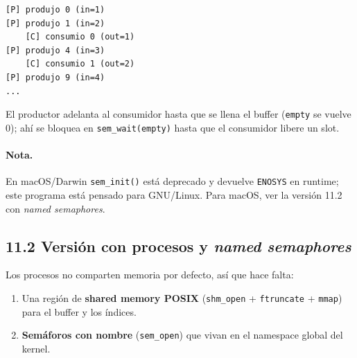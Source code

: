\documentclass[11pt,a4paper]{article}
\begin{document}
\begin{lstlisting}[style=textstyle]
[P] produjo 0 (in=1)
[P] produjo 1 (in=2)
    [C] consumio 0 (out=1)
[P] produjo 4 (in=3)
    [C] consumio 1 (out=2)
[P] produjo 9 (in=4)
...
\end{lstlisting}

El productor adelanta al consumidor hasta que se llena el buffer
(\texttt{empty} se vuelve 0); ahí se bloquea en
\texttt{sem\_wait(empty)} hasta que el consumidor libere un slot.

\paragraph{Nota.} En macOS/Darwin \texttt{sem\_init()} está deprecado y
devuelve \texttt{ENOSYS} en runtime; este programa está pensado para
GNU/Linux. Para macOS, ver la versión 11.2 con \emph{named semaphores}.

\subsection*{11.2 Versión con procesos y \emph{named semaphores}}

Los procesos no comparten memoria por defecto, así que hace falta:

\begin{enumerate}[leftmargin=*,nosep]
    \item Una región de \textbf{shared memory POSIX} (\texttt{shm\_open}
        + \texttt{ftruncate} + \texttt{mmap}) para el buffer y los
        índices.
    \item \textbf{Semáforos con nombre} (\texttt{sem\_open}) que vivan
        en el namespace global del kernel.
\end{enumerate}
\end{document}
